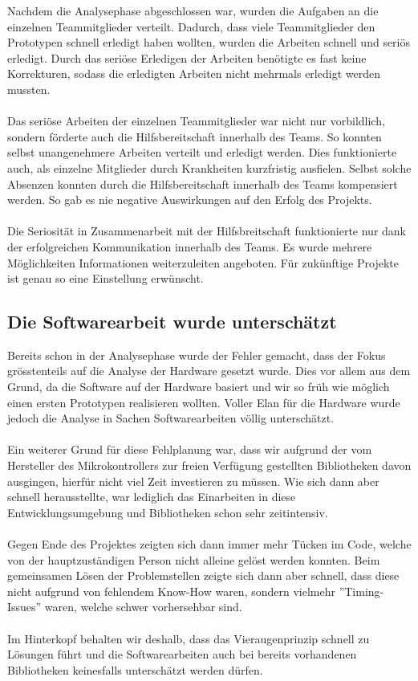 Nachdem die Analysephase abgeschlossen war, wurden die Aufgaben an die einzelnen Teammitglieder verteilt. 
Dadurch, dass viele Teammitglieder den Prototypen schnell erledigt haben wollten, wurden die Arbeiten schnell und seriös erledigt. Durch das seriöse Erledigen der Arbeiten benötigte es fast keine Korrekturen, sodass die erledigten Arbeiten nicht mehrmals erledigt werden mussten.\\
\\
Das seriöse Arbeiten der einzelnen Teammitglieder war nicht nur vorbildlich, sondern förderte auch die Hilfsbereitschaft innerhalb des Teams. So konnten selbst unangenehmere Arbeiten verteilt und erledigt werden. Dies funktionierte auch, als einzelne Mitglieder durch Krankheiten kurzfristig ausfielen. Selbst solche Absenzen konnten durch die Hilfsbereitschaft innerhalb des Teams kompensiert werden. So gab es nie negative Auswirkungen auf den Erfolg des Projekts.\\
\\
Die Seriosität in Zusammenarbeit mit der Hilfsbreitschaft funktionierte nur dank der erfolgreichen Kommunikation innerhalb des Teams. Es wurde mehrere Möglichkeiten Informationen weiterzuleiten angeboten. Für zukünftige Projekte ist genau so eine Einstellung erwünscht. 

\subsection{Die Softwarearbeit wurde unterschätzt}

Bereits schon in der Analysephase wurde der Fehler gemacht, dass der Fokus grösstenteils auf die Analyse der Hardware gesetzt wurde. Dies vor allem aus dem Grund, da die Software auf der Hardware basiert und wir so früh wie möglich einen ersten Prototypen realisieren wollten. Voller Elan für die Hardware wurde jedoch die Analyse in Sachen Softwarearbeiten völlig unterschätzt.\\
\\
Ein weiterer Grund für diese Fehlplanung war, dass wir aufgrund der vom Hersteller des Mikrokontrollers zur freien Verfügung gestellten Bibliotheken davon ausgingen, hierfür nicht viel Zeit investieren zu müssen. Wie sich dann aber schnell herausstellte, war lediglich das Einarbeiten in diese Entwicklungsumgebung und Bibliotheken schon sehr zeitintensiv.\\
\\
Gegen Ende des Projektes zeigten sich dann immer mehr Tücken im Code, welche von der hauptzuständigen Person nicht alleine gelöst werden konnten. Beim gemeinsamen Lösen der Problemstellen zeigte sich dann aber schnell, dass diese nicht aufgrund von fehlendem Know-How waren, sondern vielmehr ''Timing-Issues'' waren, welche schwer vorhersehbar sind.\\
\\
Im Hinterkopf behalten wir deshalb, dass das Vieraugenprinzip schnell zu Lösungen führt und die Softwarearbeiten auch bei bereits vorhandenen Bibliotheken keinesfalls unterschätzt werden dürfen.


